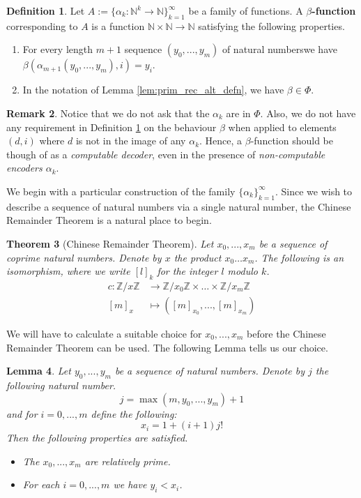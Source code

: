 \documentclass[12pt]{article}
\theoremstyle{plain}
\newtheorem{thm}{Theorem}[subsection] %
\newtheorem{lemma}[thm]{Lemma}
\theoremstyle{definition}
\newtheorem{defn}[thm]{Definition} %
\newtheorem{remark}[thm]{Remark}
\newcommand{\bb}[1]{\mathbb{#1}}
\newcommand{\lto}{\longrightarrow}
\begin{document}
	\begin{defn}\label{def:beta_function}
		Let $A := \lbrace \alpha_k: \bb{N}^{k} \lto \bb{N}\rbrace_{k = 1}^\infty$ be a family of functions. A \textbf{$\beta$-function} corresponding to $A$ is a function $\bb{N} \times \bb{N} \lto \bb{N}$ satisfying the following properties.
		\begin{enumerate}
			\item\label{beta_code} For every length $m+1$ sequence $(y_0,...,y_m)$ of natural numberswe have $\beta(\alpha_{m+1}(y_0,...,y_m),i) = y_i$.
			\item In the notation of Lemma \ref{lem:prim_rec_alt_defn}, we have $\beta \in \Phi$.
		\end{enumerate} 
	\end{defn}
	\begin{remark}
		Notice that we do not ask that the $\alpha_k$ are in $\Phi$. Also, we do not have any requirement in Definition \ref{def:beta_function} on the behaviour $\beta$ when applied to elements $(d, i)$ where $d$ is not in the image of any $\alpha_k$. Hence, a $\beta$-function should be though of as a \emph{computable decoder}, even in the presence of \emph{non-computable encoders $\alpha_k$}.
	\end{remark}
	We begin with a particular construction of the family $\lbrace \alpha_k\rbrace_{k = 1}^\infty$. Since we wish to describe a sequence of natural numbers via a single natural number, the Chinese Remainder Theorem is a natural place to begin.
	\begin{thm}[Chinese Remainder Theorem]\label{thm:chinese}
		Let $x_0,...,x_m$ be a sequence of coprime natural numbers. Denote by $x$ the product $x_0\hdots x_m$. The following is an isomorphism, where we write $[l]_k$ for the integer $l$ modulo $k$.
		\begin{align}
			c: \bb{Z}/x\bb{Z} &\lto \bb{Z}/x_0\bb{Z} \times \hdots \times \bb{Z}/x_m\bb{Z}\\
			[m]_{x} &\longmapsto ([m]_{x_0},...,[m]_{x_m})
		\end{align}
	\end{thm}
	We will have to calculate a suitable choice for $x_0,...,x_m$ before the Chinese Remainder Theorem can be used. The following Lemma tells us our choice.
	\begin{lemma}
		Let $y_0,...,y_m$ be a sequence of natural numbers. Denote by $j$ the following natural number.
		\begin{equation}
			j = \operatorname{max}(m,y_0,...,y_m) + 1
		\end{equation}
		and for $i = 0,...,m$ define the following:
		\begin{equation}\label{eq:x}
			x_i = 1 + (i + 1)j!
		\end{equation}
		Then the following properties are satisfied.
		\begin{itemize}
			\item The $x_0,...,x_m$ are relatively prime.
			\item For each $i=0,...,m$ we have $y_i < x_i$.
		\end{itemize}
	\end{lemma}
\end{document}
